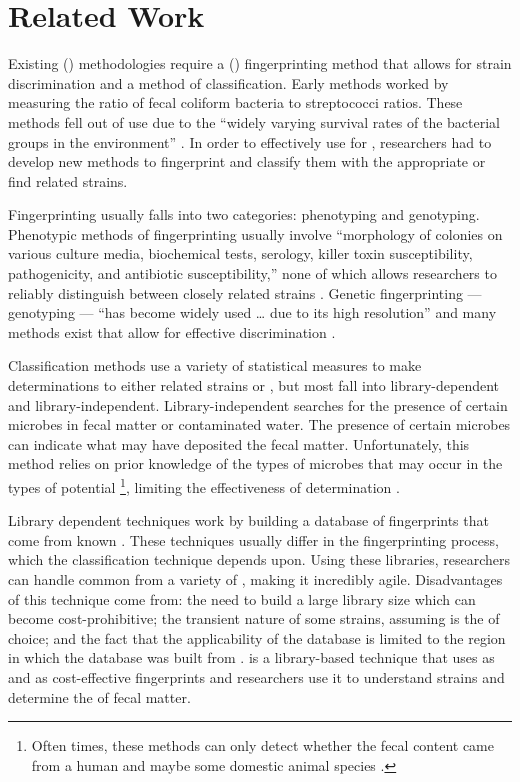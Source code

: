 \chapter{Related Work}\label{chap:related-work}

Existing \MSTlong{} (\mst{}) methodologies require a \fiblong{} (\fib{}) fingerprinting method that allows for strain discrimination and a method of classification.
Early \mst{} methods \cite{bitton2005microbial} worked by measuring the ratio of fecal coliform bacteria to streptococci ratios.
These methods fell out of use due to the ``widely varying survival rates of the bacterial groups in the environment'' \cite{sargeant2011review}.
In order to effectively use \fib{} for \mst{}, researchers had to develop new methods to fingerprint and classify them with the appropriate \spec{} or find related strains.

Fingerprinting \fib{} usually falls into two categories: phenotyping and genotyping.
Phenotypic methods of fingerprinting usually involve ``morphology of colonies on various culture media, biochemical tests, serology, killer toxin susceptibility, pathogenicity, and antibiotic susceptibility,'' none of which allows researchers to reliably distinguish between closely related strains \cite{Li892}.
Genetic fingerprinting --- genotyping --- ``has become widely used \dots{} due to its high resolution'' \cite{Li892} and many methods exist that allow for effective discrimination \cite{sargeant2011review, scott2002microbial}.

Classification methods use a variety of statistical measures to make determinations to either related strains or \spec{}, but most fall into library-dependent and library-independent.
Library-independent \mst{} searches for the presence of certain microbes in fecal matter or contaminated water.
The presence of certain microbes can indicate what \spec{} may have deposited the fecal matter.
Unfortunately, this method relies on prior knowledge of the types of microbes that may occur in the types of potential \spec{}\footnote{Often times, these methods can only detect whether the fecal content came from a human and maybe some domestic animal species \cite{sargeant2011review}.}, limiting the effectiveness of \spec{} determination \cite{sargeant2011review}.

Library dependent techniques work by building a database of \fib{} fingerprints that come from known \spec{}.
These techniques usually differ in the fingerprinting process, which the classification technique depends upon.
Using these libraries, researchers can handle common \fib{} from a variety of \spec{}, making it incredibly agile.
Disadvantages of this technique come from: the need to build a large library size which can become cost-prohibitive; the transient nature of some \ecoli{} strains, assuming \ecoli{} is the \fib{} of choice; and the fact that the applicability of the database is limited to the region in which the database was built from \cite{sargeant2011review}.
\cplop{} is a library-based \mst{} technique that uses \ecoli{} as \fib{} and \pyros{} as cost-effective fingerprints and researchers use it to understand \ecoli{} strains and determine the \spec{} of fecal matter.

